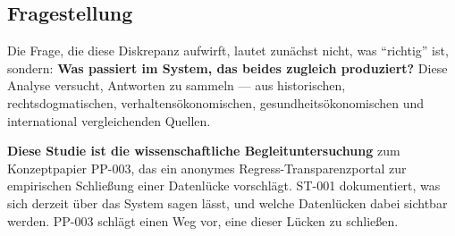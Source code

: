 \documentclass{umbruch-position}
\begin{document}
\subsection{Fragestellung}

Die Frage, die diese Diskrepanz aufwirft, lautet zunächst nicht, was ``richtig'' ist, sondern: \textbf{Was passiert im System, das beides zugleich produziert?} Diese Analyse versucht, Antworten zu sammeln --- aus historischen, rechtsdogmatischen, verhaltensökonomischen, gesundheitsökonomischen und international vergleichenden Quellen.

\textbf{Diese Studie ist die wissenschaftliche Begleituntersuchung} zum Konzeptpapier PP-003, das ein anonymes Regress-Transparenzportal zur empirischen Schließung einer Datenlücke vorschlägt. ST-001 dokumentiert, was sich derzeit über das System sagen lässt, und welche Datenlücken dabei sichtbar werden. PP-003 schlägt einen Weg vor, eine dieser Lücken zu schließen.
\end{document}
